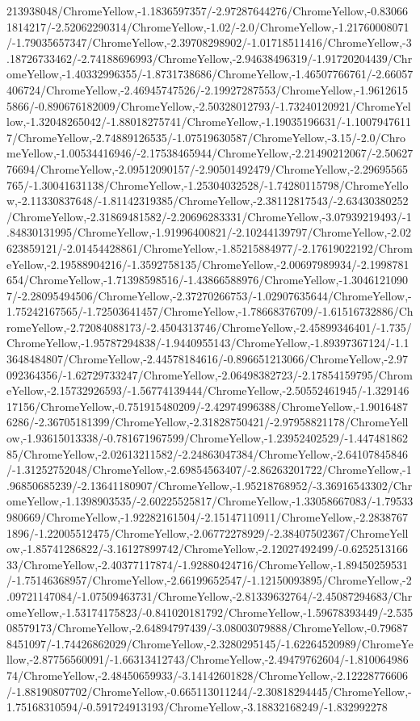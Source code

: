 {\begin{tikzternal}
213938048/ChromeYellow,-1.1836597357/-2.97287644276/ChromeYellow,-0.830661814217/-2.52062290314/ChromeYellow,-1.02/-2.0/ChromeYellow,-1.21760008071/-1.79035657347/ChromeYellow,-2.39708298902/-1.01718511416/ChromeYellow,-3.18726733462/-2.74188696993/ChromeYellow,-2.94638496319/-1.91720204439/ChromeYellow,-1.40332996355/-1.8731738686/ChromeYellow,-1.46507766761/-2.66057406724/ChromeYellow,-2.46945747526/-2.19927287553/ChromeYellow,-1.96126155866/-0.890676182009/ChromeYellow,-2.50328012793/-1.73240120921/ChromeYellow,-1.32048265042/-1.88018275741/ChromeYellow,-1.19035196631/-1.10079476117/ChromeYellow,-2.74889126535/-1.07519630587/ChromeYellow,-3.15/-2.0/ChromeYellow,-1.00534416946/-2.17538465944/ChromeYellow,-2.21490212067/-2.5062776694/ChromeYellow,-2.09512090157/-2.90501492479/ChromeYellow,-2.29695565765/-1.30041631138/ChromeYellow,-1.25304032528/-1.74280115798/ChromeYellow,-2.11330837648/-1.81142319385/ChromeYellow,-2.38112817543/-2.63430380252/ChromeYellow,-2.31869481582/-2.20696283331/ChromeYellow,-3.07939219493/-1.84830131995/ChromeYellow,-1.91996400821/-2.10244139797/ChromeYellow,-2.02623859121/-2.01454428861/ChromeYellow,-1.85215884977/-2.17619022192/ChromeYellow,-2.19588904216/-1.3592758135/ChromeYellow,-2.00697989934/-2.1998781654/ChromeYellow,-1.71398598516/-1.43866588976/ChromeYellow,-1.30461210907/-2.28095494506/ChromeYellow,-2.37270266753/-1.02907635644/ChromeYellow,-1.75242167565/-1.72503641457/ChromeYellow,-1.78668376709/-1.61516732886/ChromeYellow,-2.72084088173/-2.4504313746/ChromeYellow,-2.45899346401/-1.735/ChromeYellow,-1.95787294838/-1.9440955143/ChromeYellow,-1.89397367124/-1.13648484807/ChromeYellow,-2.44578184616/-0.896651213066/ChromeYellow,-2.97092364356/-1.62729733247/ChromeYellow,-2.06498382723/-2.17854159795/ChromeYellow,-2.15732926593/-1.56774139444/ChromeYellow,-2.50552461945/-1.32914617156/ChromeYellow,-0.751915480209/-2.42974996388/ChromeYellow,-1.90164876286/-2.36705181399/ChromeYellow,-2.31828750421/-2.97958821178/ChromeYellow,-1.93615013338/-0.781671967599/ChromeYellow,-1.23952402529/-1.44748186285/ChromeYellow,-2.02613211582/-2.24863047384/ChromeYellow,-2.64107845846/-1.31252752048/ChromeYellow,-2.69854563407/-2.86263201722/ChromeYellow,-1.96850685239/-2.13641180907/ChromeYellow,-1.95218768952/-3.36916543302/ChromeYellow,-1.1398903535/-2.60225525817/ChromeYellow,-1.33058667083/-1.79533980669/ChromeYellow,-1.92282161504/-2.15147110911/ChromeYellow,-2.28387671896/-1.22005512475/ChromeYellow,-2.06772278929/-2.38407502367/ChromeYellow,-1.85741286822/-3.16127899742/ChromeYellow,-2.12027492499/-0.625251316633/ChromeYellow,-2.40377117874/-1.92880424716/ChromeYellow,-1.89450259531/-1.75146368957/ChromeYellow,-2.66199652547/-1.12150093895/ChromeYellow,-2.09721147084/-1.07509463731/ChromeYellow,-2.81339632764/-2.45087294683/ChromeYellow,-1.53174175823/-0.841020181792/ChromeYellow,-1.59678393449/-2.53508579173/ChromeYellow,-2.64894797439/-3.08003079888/ChromeYellow,-0.796878451097/-1.74426862029/ChromeYellow,-2.3280295145/-1.62264520989/ChromeYellow,-2.87756560091/-1.66313412743/ChromeYellow,-2.49479762604/-1.81006498674/ChromeYellow,-2.48450659933/-3.14142601828/ChromeYellow,-2.12228776606/-1.88190807702/ChromeYellow,-0.665113011244/-2.30818294445/ChromeYellow,-1.75168310594/-0.591724913193/ChromeYellow,-3.18832168249/-1.832992278
\end{tikzternal}}
